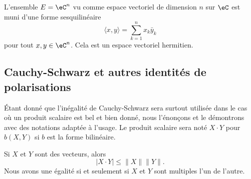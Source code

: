 \begin{example}
    L'ensemble \( E=\eC^n\) vu comme espace vectoriel de dimension \( n\) sur \( \eC\)  est muni d'une forme sesquilinéaire
    \begin{equation}    \label{EqFormSesqQrjyPH}
        \langle x, y\rangle =\sum_{k=1}^nx_k\bar y_k
    \end{equation}
    pour tout \( x,y\in\eC^n\). Cela est un espace vectoriel hermitien.
\end{example}

\subsection{Cauchy-Schwarz et autres identités de polarisations}

Étant donné que l'inégalité de Cauchy-Schwarz sera surtout utilisée dans le cas où un produit scalaire est bel et bien donné, nous l'énonçons et le démontrons avec des notations adaptée à l'usage. Le produit scalaire sera noté \( X\cdot Y\) pour \( b(X,Y)\) si \( b\) est la forme bilinéaire.
\begin{theorem}      \label{ThoAYfEHG}
	Si $X$ et $Y$ sont des vecteurs, alors
    \begin{equation}        \label{EQooZDSHooWPcryG}
		| X\cdot Y |\leq\| X \|\| Y \|.
	\end{equation}
    Nous avons une égalité si et seulement si \( X\) et \( Y\) sont multiples l'un de l'autre.
\end{theorem}

